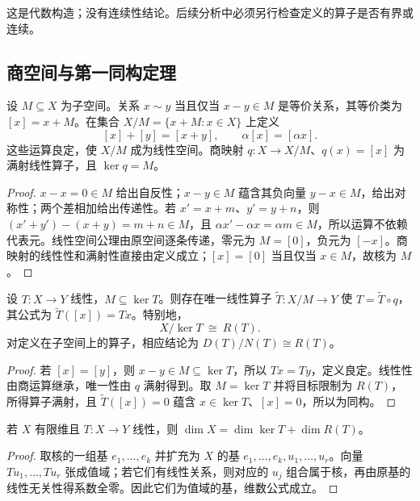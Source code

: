 这是代数构造；没有连续性结论。后续分析中必须另行检查定义的算子是否有界或连续。

\subsection{商空间与第一同构定理}
\begin{theorem}[商线性空间]\label{thm:y0-quotient}
设 $M\subseteq X$ 为子空间。关系 $x\sim y$ 当且仅当 $x-y\in M$ 是等价关系，其等价类为 $[x]=x+M$。在集合 $X/M=\{x+M:x\in X\}$ 上定义
\[
 [x]+[y]=[x+y],\qquad\alpha[x]=[\alpha x].
\]
这些运算良定，使 $X/M$ 成为线性空间。商映射 $q:X\to X/M$、$q(x)=[x]$ 为满射线性算子，且 $\ker q=M$。
\end{theorem}
\begin{proof}
$x-x=0\in M$ 给出自反性；$x-y\in M$ 蕴含其负向量 $y-x\in M$，给出对称性；两个差相加给出传递性。若 $x'=x+m$、$y'=y+n$，则 $(x'+y')-(x+y)=m+n\in M$，且 $\alpha x'-\alpha x=\alpha m\in M$，所以运算不依赖代表元。线性空间公理由原空间逐条传递，零元为 $M=[0]$，负元为 $[-x]$。商映射的线性性和满射性直接由定义成立；$[x]=[0]$ 当且仅当 $x\in M$，故核为 $M$。
\end{proof}

\begin{theorem}[商空间的因子分解与第一同构定理]\label{thm:y0-first-isomorphism}
设 $T:X\to Y$ 线性，$M\subseteq\ker T$。则存在唯一线性算子 $\widetilde T:X/M\to Y$ 使 $T=\widetilde T\circ q$，其公式为 $\widetilde T([x])=Tx$。特别地，
\[
 X/\ker T\ \cong\ R(T).
\]
对定义在子空间上的算子，相应结论为 $D(T)/N(T)\cong R(T)$。
\end{theorem}
\begin{proof}
若 $[x]=[y]$，则 $x-y\in M\subseteq\ker T$，所以 $Tx=Ty$，定义良定。线性性由商运算继承，唯一性由 $q$ 满射得到。取 $M=\ker T$ 并将目标限制为 $R(T)$，所得算子满射，且 $\widetilde T([x])=0$ 蕴含 $x\in\ker T$、$[x]=0$，所以为同构。
\end{proof}

\begin{corollary}\label{cor:y0-rank-nullity}
若 $X$ 有限维且 $T:X\to Y$ 线性，则 $\dim X=\dim\ker T+\dim R(T)$。
\end{corollary}
\begin{proof}
取核的一组基 $e_1,\ldots,e_k$ 并扩充为 $X$ 的基 $e_1,\ldots,e_k,u_1,\ldots,u_r$。向量 $Tu_1,\ldots,Tu_r$ 张成值域；若它们有线性关系，则对应的 $u_j$ 组合属于核，再由原基的线性无关性得系数全零。因此它们为值域的基，维数公式成立。
\end{proof}

